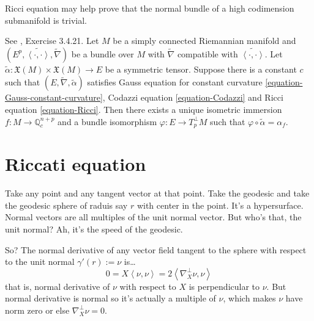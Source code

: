 Ricci equation may help prove that the normal bundle of a high codimension
submanifold is trivial.

\begin{theorem}
\label{theorem-fundamental-theorem-of-submanifolds}
See \cite{pet}, Exercise 3.4.21. Let $M$ be a simply connected Riemannian 
manifold and $(E^p,\widetilde{\left<\cdot,\cdot\right>},\tilde{\nabla})$ be a 
bundle over $M$ with $\tilde{\nabla}$ compatible with 
$\widetilde{\left<\cdot,\cdot\right>}$.
Let $\tilde{\alpha}:\mathfrak{X}(M)\times \mathfrak{X}(M)\to E$ be a symmetric
tensor. Suppose there is a constant $c$ such that
$(E,\tilde{\nabla},\tilde{\alpha})$ satisfies Gauss equation for constant
curvature \ref{equation-Gauss-constant-curvature}, Codazzi equation
\ref{equation-Codazzi} and Ricci equation \ref{equation-Ricci}. 
Then there exists a unique isometric
immersion $f:M \to \mathbb{Q}_c^{n+p}$ and a bundle isomorphism $\varphi:E \to
T^\perp_pM$ such that $\varphi\circ\tilde{\alpha}=\alpha_f$.
\end{theorem}

\section{Riccati equation}
\label{section-Riccati-equation}

Take any point and any tangent vector at that point. Take the geodesic and take
the geodesic sphere of raduis say $r$ with center in the point. It's
a hypersurface. Normal vectors are all multiples of the unit normal vector. But
who's that, the unit normal? Ah, it's the speed of the geodesic.

So? The normal derivative of any vector field tangent to the sphere with respect
to the unit normal $\gamma'(r):=\nu$ is…
$$
0=X\left<\nu,\nu\right>=2\left<\nabla^\perp_X \nu,\nu\right>
$$
that is, normal derivative of $\nu$ with respect to $X$ is perpendicular to
$\nu$. But normal derivative is normal so it's actually a multiple of $\nu$, 
which makes $\nu$ have norm zero or else $\nabla^\perp_X \nu=0$.

